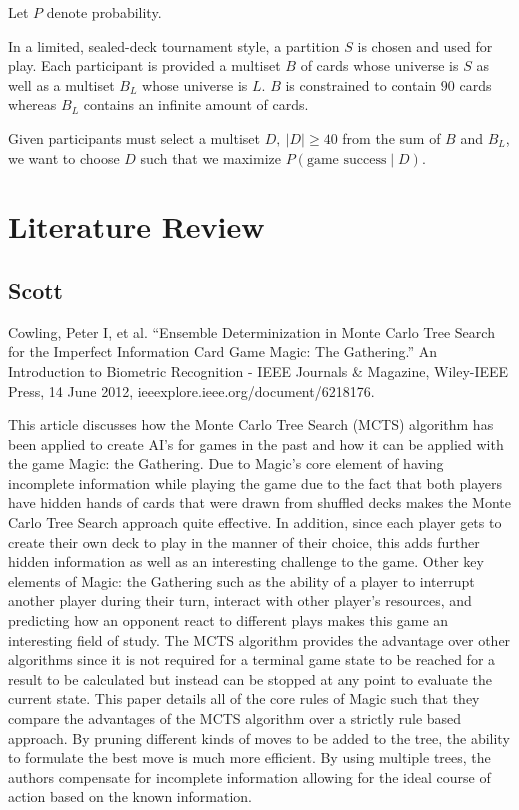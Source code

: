 \documentclass[12pt, letterpaper]{article}
\begin{document}
Let $ P $ denote probability.

In a limited, sealed-deck tournament style, a partition $ S $ is chosen and used for play.
Each participant is provided a multiset $ B $ of cards whose universe is $ S $
as well as a multiset $ B_L $ whose universe is $ L $.
$ B $ is constrained to contain $ 90 $ cards
whereas $ B_L $ contains an infinite amount of cards.

Given participants must select a multiset $ D, \ |D| \ge 40 $ from the sum of $ B $ and $ B_L $,
we want to choose $ D $ such that we maximize $ P(\text{game success} \mid D) $.

\section{Literature Review}

\subsection{Scott}

Cowling, Peter I, et al.
\enquote{Ensemble Determinization in Monte Carlo Tree Search for the Imperfect Information Card Game Magic: The Gathering.}
An Introduction to Biometric Recognition - IEEE Journals \& Magazine, Wiley-IEEE Press,
14 June 2012, ieeexplore.ieee.org/document/6218176.

This article discusses how the Monte Carlo Tree Search (MCTS) algorithm has been applied to create AI’s for games in the
past and how it can be applied with the game Magic: the Gathering. Due to Magic’s core element of having incomplete
information while playing the game due to the fact that both players have hidden hands of cards that were drawn from
shuffled decks makes the Monte Carlo Tree Search approach quite effective. In addition, since each player gets to
create their own deck to play in the manner of their choice, this adds further hidden information as well as an
interesting challenge to the game. Other key elements of Magic: the Gathering such as the ability of a player to
interrupt another player during their turn, interact with other player’s resources, and predicting how an opponent
react to different plays makes this game an interesting field of study. The MCTS algorithm provides the advantage over
other algorithms since it is not required for a terminal game state to be reached for a result to be calculated but
instead can be stopped at any point to evaluate the current state. This paper details all of the core rules of Magic
such that they compare the advantages of the MCTS algorithm over a strictly rule based approach. By pruning different
kinds of moves to be added to the tree, the ability to formulate the best move is much more efficient. By using multiple
trees, the authors compensate for incomplete information allowing for the ideal course of action based on the known
information.
\end{document}
